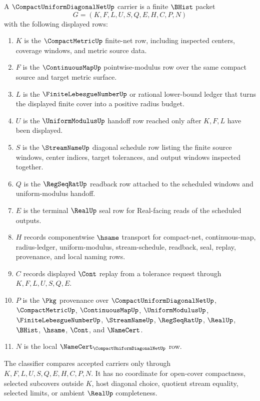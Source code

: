 \begin{definition}
\label{def:compact-uniform-diagonal-net-carrier}
A $\CompactUniformDiagonalNetUp$ carrier is a finite $\BHist$ packet
$$
G=(K,F,L,U,S,Q,E,H,C,P,N)
$$
with the following displayed rows:
\begin{enumerate}
\item $K$ is the $\CompactMetricUp$ finite-net row, including inspected centers, coverage windows, and metric source data.
\item $F$ is the $\ContinuousMapUp$ pointwise-modulus row over the same compact source and target metric surface.
\item $L$ is the $\FiniteLebesgueNumberUp$ or rational lower-bound ledger that turns the displayed finite cover into a positive radius budget.
\item $U$ is the $\UniformModulusUp$ handoff row reached only after $K,F,L$ have been displayed.
\item $S$ is the $\StreamNameUp$ diagonal schedule row listing the finite source windows, center indices, target tolerances, and output windows inspected together.
\item $Q$ is the $\RegSeqRatUp$ readback row attached to the scheduled windows and uniform-modulus handoff.
\item $E$ is the terminal $\RealUp$ seal row for Real-facing reads of the scheduled outputs.
\item $H$ records componentwise $\hsame$ transport for compact-net, continuous-map, radius-ledger, uniform-modulus, stream-schedule, readback, seal, replay, provenance, and local naming rows.
\item $C$ records displayed $\Cont$ replay from a tolerance request through $K,F,L,U,S,Q,E$.
\item $P$ is the $\Pkg$ provenance over $\CompactUniformDiagonalNetUp$, $\CompactMetricUp$, $\ContinuousMapUp$, $\UniformModulusUp$, $\FiniteLebesgueNumberUp$, $\StreamNameUp$, $\RegSeqRatUp$, $\RealUp$, $\BHist$, $\hsame$, $\Cont$, and $\NameCert$.
\item $N$ is the local $\NameCert_{\CompactUniformDiagonalNetUp}$ row.
\end{enumerate}
The classifier compares accepted carriers only through $K,F,L,U,S,Q,E,H,C,P,N$. It has no coordinate for open-cover compactness, selected subcovers outside $K$, host diagonal choice, quotient stream equality, selected limits, or ambient $\RealUp$ completeness.
\end{definition}

